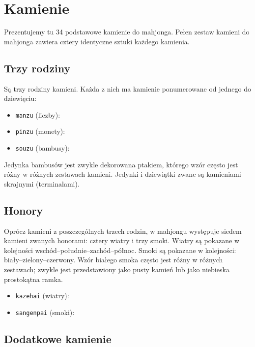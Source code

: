 \newpage
\section{Kamienie}

Prezentujemy tu 34 podstawowe kamienie do mahjonga. Pełen zestaw kamieni do mahjonga zawiera cztery identyczne sztuki każdego kamienia.

\subsection{Trzy rodziny}

Są trzy rodziny kamieni. Każda z nich ma kamienie ponumerowane od jednego do dziewięciu:

\begin{itemize}
  \item\texttt{manzu} (liczby): 
  \item\texttt{pinzu} (monety): 
  \item\texttt{souzu} (bambusy): 
\end{itemize}

Jedynka bambusów jest zwykle dekorowana ptakiem, którego wzór często jest różny w różnych zestawach kamieni. Jedynki i dziewiątki zwane są kamieniami skrajnymi (terminalami).

\subsection{Honory}

Oprócz kamieni z poszczególnych trzech rodzin, w mahjongu występuje siedem kamieni zwanych honorami: cztery wiatry i trzy smoki. Wiatry są pokazane w kolejności wschód--południe--zachód--północ. Smoki są pokazane w kolejności: biały--zielony--czerwony. Wzór białego smoka często jest różny w różnych zestawach; zwykle jest przedstawiony jako pusty kamień lub jako niebieska prostokątna ramka.

\begin{itemize}
\item\texttt{kazehai} (wiatry): 
\item\texttt{sangenpai} (smoki): 
\end{itemize}

\subsection{Dodatkowe kamienie}

